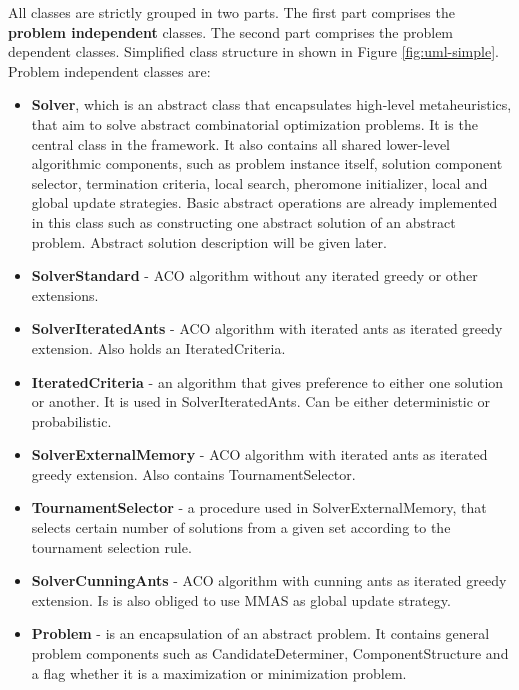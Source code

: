 \documentclass[12pt,a4paper,oneside]{book}
\begin{document}
All classes are strictly grouped in two parts. The first part comprises the \textbf{problem independent} classes. The second part comprises the problem dependent classes. Simplified class structure in shown in Figure \ref{fig:uml-simple}. Problem independent classes are:

\begin{itemize}
\item \textbf{Solver}, which is an abstract class that encapsulates high-level metaheuristics, that aim to solve abstract combinatorial optimization problems. It is the central class in the framework. It also contains all shared lower-level algorithmic components, such as problem instance itself, solution component selector, termination criteria, local search, pheromone initializer, local and global update strategies. Basic abstract operations are already implemented in this class such as constructing one abstract solution of an abstract problem. Abstract solution description will be given later.

\item \textbf{SolverStandard} - ACO algorithm without any iterated greedy or other extensions.

\item \textbf{SolverIteratedAnts} - ACO algorithm with iterated ants as iterated greedy extension. Also holds an IteratedCriteria.

\item \textbf{IteratedCriteria} - an algorithm that gives preference to either one solution or another. It is used in SolverIteratedAnts. Can be either deterministic or probabilistic.

\item \textbf{SolverExternalMemory} - ACO algorithm with iterated ants as iterated greedy extension. Also contains TournamentSelector.

\item \textbf{TournamentSelector} - a procedure used in SolverExternalMemory, that selects certain number of solutions from a given set according to the tournament selection rule.

\item \textbf{SolverCunningAnts} - ACO algorithm with cunning ants as iterated greedy extension. Is is also obliged to use MMAS as global update strategy.

\item \textbf{Problem} - is an encapsulation of an abstract problem. It contains general problem components such as CandidateDeterminer, ComponentStructure and a flag whether it is a maximization or minimization problem.


\end{itemize}
\end{document}
